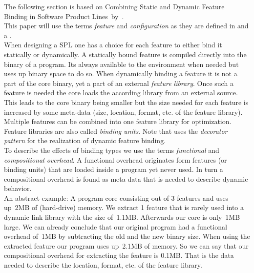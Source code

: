 The following section is based on Combining Static and Dynamic Feature Binding in Software Product Lines~by~\citet{CombiningStaticandDynamicFeatureBinding}.\\
This paper will use the terms \textit{feature} and \textit{configuration} as they are defined in \cite{AutomatedFeatureDetectionSiegmund2012}  and a .\\
When designing a SPL one has a choice for each feature to either bind it statically or dynamically.
A statically bound feature is compiled directly into the binary of a program. Its always available to the environment when needed but uses up binary space to do so.
When dynamically binding a feature it is not a part of the core binary, yet a part of an external \textit{feature library}. Once such a feature is needed the core loads the according library from an external source. This leads to the core binary being smaller but the size needed for each feature is increased by some meta-data (size, location, format, etc. of the feature library). Multiple features can be combined into one feature library for optimization. Feature libraries are also called \textit{binding units}. Note that \cite{CombiningStaticandDynamicFeatureBinding} uses the \textit{decorator pattern} for the realization of dynamic feature binding.\\
To describe the effects of binding types we use the terms \textit{functional} and \textit{compositional overhead}. A functional overhead  originates form features (or binding units) that are loaded inside a program yet never used. In turn a compositional overhead is found as meta data that is needed to describe dynamic behavior.\\An abstract example: A program core consisting out of 3 features and uses up~2MB of (hard-drive) memory. We extract 1 feature that is rarely used into a dynamic link library with the size of~1.1MB. Afterwards our core is only~1MB large. We can already conclude that our original program had a functional overhead of~1MB by subtracting the old and the new binary size. When using the extracted feature our program uses up~2.1MB of memory. So we can say that our compositional overhead for extracting the feature is 0.1MB. That is the data needed to describe the location, format, etc. of the feature library.\\
